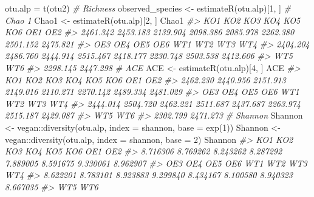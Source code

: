 \documentclass[
]{article}
\newenvironment{Shaded}{\begin{snugshade}}{\end{snugshade}}
\newcommand{\AttributeTok}[1]{\textcolor[rgb]{0.77,0.63,0.00}{#1}}
\newcommand{\CommentTok}[1]{\textcolor[rgb]{0.56,0.35,0.01}{\textit{#1}}}
\newcommand{\DecValTok}[1]{\textcolor[rgb]{0.00,0.00,0.81}{#1}}
\newcommand{\FunctionTok}[1]{\textcolor[rgb]{0.00,0.00,0.00}{#1}}
\newcommand{\NormalTok}[1]{#1}
\newcommand{\OtherTok}[1]{\textcolor[rgb]{0.56,0.35,0.01}{#1}}
\newcommand{\SpecialCharTok}[1]{\textcolor[rgb]{0.00,0.00,0.00}{#1}}
\newcommand{\StringTok}[1]{\textcolor[rgb]{0.31,0.60,0.02}{#1}}
\begin{document}
\begin{Shaded}
\begin{Highlighting}[]
\NormalTok{otu.alp }\OtherTok{=} \FunctionTok{t}\NormalTok{(otu2)}
\CommentTok{\# Richness}
\NormalTok{observed\_species }\OtherTok{\textless{}{-}} \FunctionTok{estimateR}\NormalTok{(otu.alp)[}\DecValTok{1}\NormalTok{, ]}
\CommentTok{\# Chao 1}
\NormalTok{Chao1  }\OtherTok{\textless{}{-}} \FunctionTok{estimateR}\NormalTok{(otu.alp)[}\DecValTok{2}\NormalTok{, ]}
\NormalTok{Chao1}
\CommentTok{\#\textgreater{}      KO1      KO2      KO3      KO4      KO5      KO6      OE1      OE2 }
\CommentTok{\#\textgreater{} 2461.342 2453.183 2139.904 2098.386 2085.978 2262.380 2501.152 2475.821 }
\CommentTok{\#\textgreater{}      OE3      OE4      OE5      OE6      WT1      WT2      WT3      WT4 }
\CommentTok{\#\textgreater{} 2404.204 2486.760 2444.914 2515.467 2418.177 2230.748 2503.538 2412.606 }
\CommentTok{\#\textgreater{}      WT5      WT6 }
\CommentTok{\#\textgreater{} 2298.145 2447.298}
\CommentTok{\# ACE}
\NormalTok{ACE  }\OtherTok{\textless{}{-}} \FunctionTok{estimateR}\NormalTok{(otu.alp)[}\DecValTok{4}\NormalTok{, ]}
\NormalTok{ACE}
\CommentTok{\#\textgreater{}      KO1      KO2      KO3      KO4      KO5      KO6      OE1      OE2 }
\CommentTok{\#\textgreater{} 2462.230 2440.956 2151.913 2149.016 2110.271 2270.142 2489.334 2481.029 }
\CommentTok{\#\textgreater{}      OE3      OE4      OE5      OE6      WT1      WT2      WT3      WT4 }
\CommentTok{\#\textgreater{} 2444.014 2504.720 2462.221 2511.687 2437.687 2263.974 2515.187 2429.087 }
\CommentTok{\#\textgreater{}      WT5      WT6 }
\CommentTok{\#\textgreater{} 2302.799 2471.273}
\CommentTok{\# Shannon}
\NormalTok{Shannon }\OtherTok{\textless{}{-}}\NormalTok{ vegan}\SpecialCharTok{::}\FunctionTok{diversity}\NormalTok{(otu.alp, }\AttributeTok{index =} \StringTok{\textquotesingle{}shannon\textquotesingle{}}\NormalTok{, }\AttributeTok{base =} \FunctionTok{exp}\NormalTok{(}\DecValTok{1}\NormalTok{))}
\NormalTok{Shannon }\OtherTok{\textless{}{-}}\NormalTok{ vegan}\SpecialCharTok{::}\FunctionTok{diversity}\NormalTok{(otu.alp, }\AttributeTok{index =} \StringTok{\textquotesingle{}shannon\textquotesingle{}}\NormalTok{, }\AttributeTok{base =} \DecValTok{2}\NormalTok{)}
\NormalTok{Shannon}
\CommentTok{\#\textgreater{}      KO1      KO2      KO3      KO4      KO5      KO6      OE1      OE2 }
\CommentTok{\#\textgreater{} 8.716306 8.769262 8.243262 8.287292 7.889005 8.591675 9.330061 8.962907 }
\CommentTok{\#\textgreater{}      OE3      OE4      OE5      OE6      WT1      WT2      WT3      WT4 }
\CommentTok{\#\textgreater{} 8.622201 8.783101 8.923883 9.299840 8.434167 8.100580 8.940323 8.667035 }
\CommentTok{\#\textgreater{}      WT5      WT6 }

\end{Highlighting}
\end{Shaded}
\end{document}
